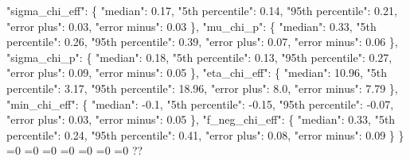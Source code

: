 {{      "sigma\_chi\_eff": \{%
        "median": 0.17, %
        "5th percentile": 0.14, %
        "95th percentile": 0.21, %
        "error plus": 0.03, %
        "error minus": 0.03%
      \}, %
      "mu\_chi\_p": \{%
        "median": 0.33, %
        "5th percentile": 0.26, %
        "95th percentile": 0.39, %
        "error plus": 0.07, %
        "error minus": 0.06%
      \}, %
      "sigma\_chi\_p": \{%
        "median": 0.18, %
        "5th percentile": 0.13, %
        "95th percentile": 0.27, %
        "error plus": 0.09, %
        "error minus": 0.05%
      \}, %
      "eta\_chi\_eff": \{%
        "median": 10.96, %
        "5th percentile": 3.17, %
        "95th percentile": 18.96, %
        "error plus": 8.0, %
        "error minus": 7.79%
      \}, %
      "min\_chi\_eff": \{%
        "median": {-}0.1, %
        "5th percentile": {-}0.15, %
        "95th percentile": {-}0.07, %
        "error plus": 0.03, %
        "error minus": 0.05%
      \}, %
      "f\_neg\_chi\_eff": \{%
        "median": 0.33, %
        "5th percentile": 0.24, %
        "95th percentile": 0.41, %
        "error plus": 0.08, %
        "error minus": 0.09%
      \}%
    \}}%
  \else%
    \ifnum{}=0%
      \let\SkewNormalChiEff@I@out\SkewNormalChiEff@III%
    \else%
      \ifnum{}=0%
      \let\SkewNormalChiEff@I@out\SkewNormalChiEff@IV%
    \else%
      \ifnum{}=0%
      \let\SkewNormalChiEff@I@out\SkewNormalChiEff@V%
    \else%
      \ifnum{}=0%
      \let\SkewNormalChiEff@I@out\SkewNormalChiEff@VI%
    \else%
      \ifnum{}=0%
      \let\SkewNormalChiEff@I@out\SkewNormalChiEff@VII%
    \else%
      \ifnum{}=0%
      \let\SkewNormalChiEff@I@out\SkewNormalChiEff@VIII%
    \else%
      \ifnum{}=0%
      \let\SkewNormalChiEff@I@out\SkewNormalChiEff@IX%
    \else%
      \def\SkewNormalChiEff@I@out{%
    ??}%
    \fi\fi\fi\fi\fi\fi\fi
  \fi
  \SkewNormalChiEff@I@out
}\newcommand\SkewNormalChiEff@II[1][all]{%
  \ifnum\pdfstrcmp{#1}{all}=0%
    \def\SkewNormalChiEff@II@out{%
    \{%
      "chi\_eff": \{%
        "median": 0.03, %
        "5th percentile": {-}0.08, %
        "95th percentile": 0.26, %
        "spin at peak": {-}0.03%
      \}, %
      "chi\_p": \{%
        "median": 0.34, %
        "5th percentile": 0.08, %
        "95th percentile": 0.65, %
        "spin at peak": 0.33%
      \}%
    \}}%
  \else%
    \ifnum\pdfstrcmp{#1}{chi_eff}=0%
      \let\SkewNormalChiEff@II@out\SkewNormalChiEff@X%
    \else%
}
